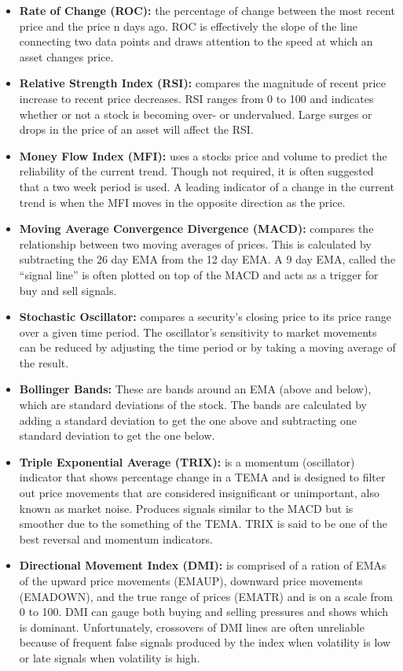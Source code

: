 \documentclass[11pt]{article}
\newcommand*\apos{\textsc{\char13}}
\begin{document}
\begin{itemize}
\item \textbf{Rate of Change (ROC):} the percentage of change between the most recent price and the price n days ago. ROC is effectively the slope of the line connecting two data points and draws attention to the speed at which an asset changes price.
\item \textbf{Relative Strength Index (RSI):} compares the magnitude of recent price increase to recent price decreases. RSI ranges from 0 to 100 and indicates whether or not a stock is becoming over- or undervalued. Large surges or drops in the price of an asset will affect the RSI.
\item \textbf{Money Flow Index (MFI):} uses a stock\apos s price and volume to predict the reliability of the current trend. Though not required, it is often suggested that a two week period is used. A leading indicator of a change in the current trend is when the MFI moves in the opposite direction as the price.
\item \textbf{Moving Average Convergence Divergence (MACD):} compares the relationship between two moving averages of prices. This is calculated by subtracting the 26 day EMA from the 12 day EMA. A 9 day EMA, called the ``signal line” is often plotted on top of the MACD and acts as a trigger for buy and sell signals.
\item \textbf{Stochastic Oscillator:} compares a security’s closing price to its price range over a given time period. The oscillator’s sensitivity to market movements can be reduced by adjusting the time period or by taking a moving average of the result. 
\item \textbf{Bollinger Bands:} These are bands around an EMA (above and below), which are standard deviations of the stock. The bands are calculated by adding a standard deviation to get the one above and subtracting one standard deviation to get the one below. 
\item \textbf{Triple Exponential Average (TRIX):} is a momentum (oscillator) indicator that shows percentage change in a TEMA and is designed to filter out price movements that are considered insignificant or unimportant, also known as market noise. Produces signals similar to the MACD but is smoother due to the something of the TEMA. TRIX is said to be one of the best reversal and momentum indicators.\textsuperscript{\cite{INV}}
\item \textbf{Directional Movement Index (DMI):} is comprised of a ration of EMAs of the upward price movements (EMAUP), downward price movements (EMADOWN), and the true range of prices (EMATR) and is on a scale from 0 to 100. DMI can gauge both buying and selling pressures and shows which is dominant. Unfortunately, crossovers of DMI lines are often unreliable because of frequent false signals produced by the index when volatility is low or late signals when volatility is high.

\end{itemize}
\end{document}
